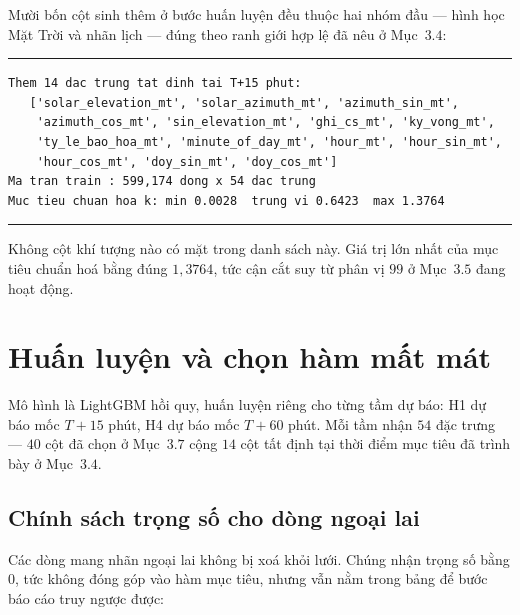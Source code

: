 \documentclass[12pt,a4paper]{article}
\DeclareRobustCommand{\tep}[1]{\texttt{\detokenize{#1}}}
\renewcommand{\baselinestretch}{1.35}
\begin{document}
\enlargethispage{3\baselineskip}
Mười bốn cột \tep{_mt} sinh thêm ở bước huấn luyện đều thuộc hai nhóm đầu --- hình học Mặt Trời
và nhãn lịch --- đúng theo ranh giới hợp lệ đã nêu ở Mục~$3.4$:

\begingroup
\par\vspace{6pt}\hrule\vspace{4pt}
\small\renewcommand{\baselinestretch}{1.0}\selectfont
\begin{verbatim}
Them 14 dac trung tat dinh tai T+15 phut:
   ['solar_elevation_mt', 'solar_azimuth_mt', 'azimuth_sin_mt',
    'azimuth_cos_mt', 'sin_elevation_mt', 'ghi_cs_mt', 'ky_vong_mt',
    'ty_le_bao_hoa_mt', 'minute_of_day_mt', 'hour_mt', 'hour_sin_mt',
    'hour_cos_mt', 'doy_sin_mt', 'doy_cos_mt']
Ma tran train : 599,174 dong x 54 dac trung
Muc tieu chuan hoa k: min 0.0028  trung vi 0.6423  max 1.3764
\end{verbatim}
\vspace{2pt}\hrule\par\vspace{6pt}
\endgroup

Không cột khí tượng nào có mặt trong danh sách này. Giá trị lớn nhất của mục tiêu chuẩn hoá
bằng đúng $1{,}3764$, tức cận cắt suy từ phân vị $99$ ở Mục~$3.5$ đang hoạt động.

\section{Huấn luyện và chọn hàm mất mát}

Mô hình là LightGBM hồi quy, huấn luyện riêng cho từng tầm dự báo: H1 dự báo mốc $T{+}15$ phút,
H4 dự báo mốc $T{+}60$ phút. Mỗi tầm nhận $54$ đặc trưng --- $40$ cột đã chọn ở Mục~$3.7$ cộng
$14$ cột tất định tại thời điểm mục tiêu đã trình bày ở Mục~$3.4$.

\subsection{Chính sách trọng số cho dòng ngoại lai}

Các dòng mang nhãn ngoại lai không bị xoá khỏi lưới. Chúng nhận trọng số bằng $0$, tức không
đóng góp vào hàm mục tiêu, nhưng vẫn nằm trong bảng để bước báo cáo truy ngược được:
\end{document}

